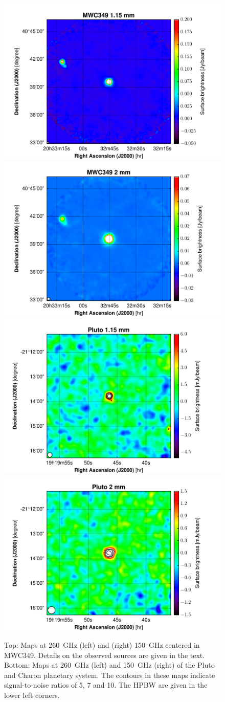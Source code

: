 \documentclass[]{aa} %
\begin{document}
\begin{figure}[h]
   \centering
   \includegraphics[width=.45\linewidth]{MWC349_1mm_map_snrcont.pdf}
    \includegraphics[width=.45\linewidth]{MWC349_2mm_map_snrcont.pdf} 
        \includegraphics[width=.45\linewidth]{Pluto_1mm_map_snrcont.pdf}
    \includegraphics[width=.45\linewidth]{Pluto_2mm_map_snrcont.pdf}
      \caption{Top: Maps at 260~GHz (left) and  (right) 150~GHz centered in MWC349. Details on the observed sources are given in the text. Bottom: Maps at 260~GHz (left) and 150~GHz (right) of the Pluto and Charon planetary system. The contours in these maps indicate signal-to-noise ratios of 5, 7 and 10. The HPBW are given in the lower left corners.
         \label{fig_compact_sources}}
\end{figure}
\end{document}
